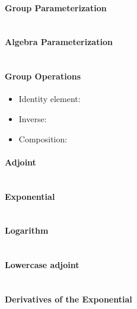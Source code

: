 \begin{properties}[breakable, title={$\SEthree$ parameterized by $\Sthree \times \mathbb{R}^{3}$}]
\paragraph{Group Parameterization}
\begin{equation}
\end{equation}

\paragraph{Algebra Parameterization}
\begin{equation}
\end{equation}

\paragraph{Group Operations}
\begin{itemize}
  \item Identity element:
  \item Inverse:
  \item Composition:
\end{itemize}

\paragraph{Adjoint}
\begin{equation}
\end{equation}

\paragraph{Exponential}
\begin{equation}
\end{equation}

\paragraph{Logarithm}
\begin{equation}
\end{equation}

\paragraph{Lowercase adjoint}
\begin{equation}
\end{equation}

\paragraph{Derivatives of the Exponential}
\begin{equation}
\end{equation}
\end{properties}


